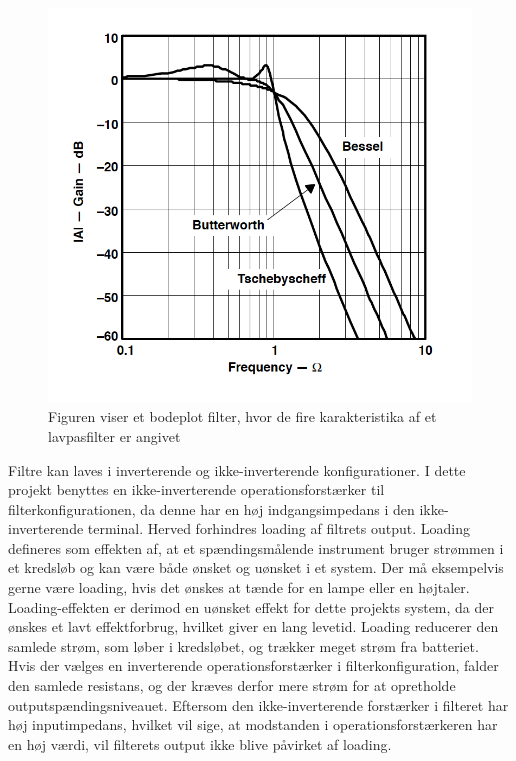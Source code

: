 \begin{figure}[H]
	\centering
	\includegraphics[scale=0.8]{figures/cProblemloesning/type_filtre.PNG}
	\caption{Figuren viser et bodeplot filter, hvor de fire karakteristika af et lavpasfilter er angivet}
	\label{fig:type_filtre}
\end{figure}

Filtre kan laves i inverterende og ikke-inverterende konfigurationer. I dette projekt benyttes en ikke-inverterende operationsforstærker til filterkonfigurationen, da denne har en høj indgangsimpedans i den ikke-inverterende terminal. Herved forhindres loading af filtrets output. Loading defineres som effekten af, at et spændingsmålende instrument bruger strømmen i et kredsløb og kan være både ønsket og uønsket i et system. Der må eksempelvis gerne være loading, hvis det ønskes at tænde for en lampe eller en højtaler. Loading-effekten er derimod en uønsket effekt for dette projekts system, da der ønskes et lavt effektforbrug, hvilket giver en lang levetid. Loading reducerer den samlede strøm, som løber i kredsløbet, og trækker meget strøm fra batteriet. \\
Hvis der vælges en inverterende operationsforstærker i filterkonfiguration, falder den samlede resistans, og der kræves derfor mere strøm for at opretholde outputspændingsniveauet. Eftersom den ikke-inverterende forstærker i filteret har høj inputimpedans, hvilket vil sige, at modstanden i operationsforstærkeren har en høj værdi, vil filterets output ikke blive påvirket af loading. \cite{Webster2009,Carter2013,Karni2014}

